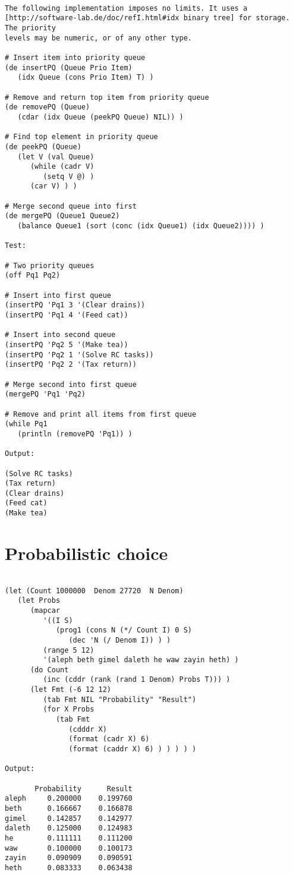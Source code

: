 \begin{verbatim}

The following implementation imposes no limits. It uses a
[http://software-lab.de/doc/refI.html#idx binary tree] for storage. The priority
levels may be numeric, or of any other type.

# Insert item into priority queue
(de insertPQ (Queue Prio Item)
   (idx Queue (cons Prio Item) T) )

# Remove and return top item from priority queue
(de removePQ (Queue)
   (cdar (idx Queue (peekPQ Queue) NIL)) )

# Find top element in priority queue
(de peekPQ (Queue)
   (let V (val Queue)
      (while (cadr V)
         (setq V @) )
      (car V) ) )

# Merge second queue into first
(de mergePQ (Queue1 Queue2)
   (balance Queue1 (sort (conc (idx Queue1) (idx Queue2)))) )

Test:

# Two priority queues
(off Pq1 Pq2)

# Insert into first queue
(insertPQ 'Pq1 3 '(Clear drains))
(insertPQ 'Pq1 4 '(Feed cat))

# Insert into second queue
(insertPQ 'Pq2 5 '(Make tea))
(insertPQ 'Pq2 1 '(Solve RC tasks))
(insertPQ 'Pq2 2 '(Tax return))

# Merge second into first queue
(mergePQ 'Pq1 'Pq2)

# Remove and print all items from first queue
(while Pq1
   (println (removePQ 'Pq1)) )

Output:

(Solve RC tasks)
(Tax return)
(Clear drains)
(Feed cat)
(Make tea)

\end{verbatim}

\section*{Probabilistic choice}

\begin{verbatim}

(let (Count 1000000  Denom 27720  N Denom)
   (let Probs
      (mapcar
         '((I S)
            (prog1 (cons N (*/ Count I) 0 S)
               (dec 'N (/ Denom I)) ) )
         (range 5 12)
         '(aleph beth gimel daleth he waw zayin heth) )
      (do Count
         (inc (cddr (rank (rand 1 Denom) Probs T))) )
      (let Fmt (-6 12 12)
         (tab Fmt NIL "Probability" "Result")
         (for X Probs
            (tab Fmt
               (cdddr X)
               (format (cadr X) 6)
               (format (caddr X) 6) ) ) ) ) )

Output:

       Probability      Result
aleph     0.200000    0.199760
beth      0.166667    0.166878
gimel     0.142857    0.142977
daleth    0.125000    0.124983
he        0.111111    0.111200
waw       0.100000    0.100173
zayin     0.090909    0.090591
heth      0.083333    0.063438

\end{verbatim}

